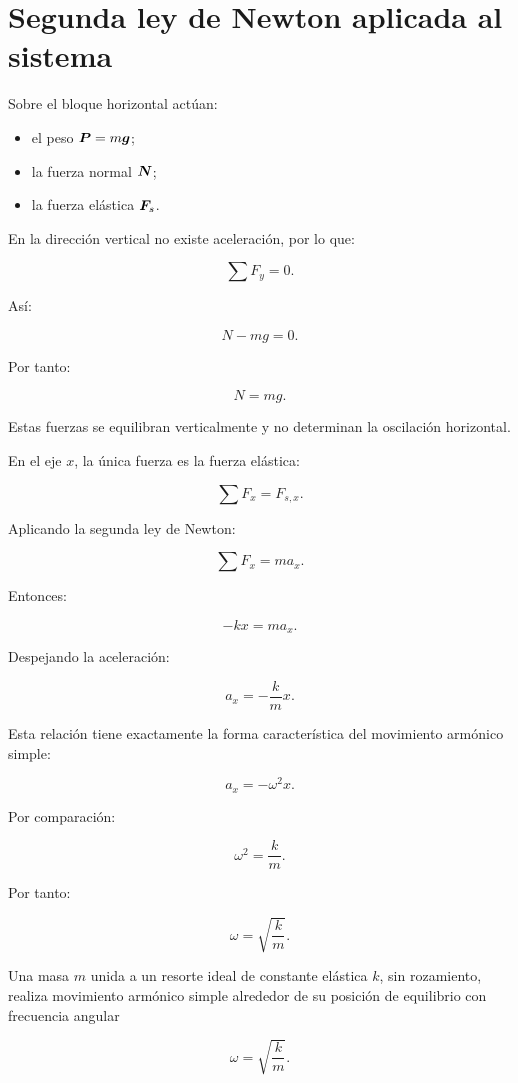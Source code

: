 \section{Segunda ley de Newton aplicada al sistema}

Sobre el bloque horizontal actúan:

\begin{itemize}
    \item el peso \(\bm{P}=m\bm{g}\);
    \item la fuerza normal \(\bm{N}\);
    \item la fuerza elástica \(\bm{F}_s\).
\end{itemize}

En la dirección vertical no existe aceleración, por lo que:

\[ \sum F_y=0. \]

Así:

\[ N-mg=0. \]

Por tanto:

\[ N=mg. \]

Estas fuerzas se equilibran verticalmente y no determinan la oscilación horizontal.

En el eje \(x\), la única fuerza es la fuerza elástica:

\[ \sum F_x=F_{s,x}. \]

Aplicando la segunda ley de Newton:

\[ \sum F_x=ma_x. \]

Entonces:

\[ -kx=ma_x. \]

Despejando la aceleración:

\[ a_x=-\frac{k}{m}x. \]

Esta relación tiene exactamente la forma característica del movimiento armónico simple:

\[ a_x=-\omega^2x. \]

Por comparación:

\[ \omega^2=\frac{k}{m}. \]

Por tanto:

\[ \boxed{\omega=\sqrt{\frac{k}{m}}}. \]

\begin{leyfisica}
Una masa \(m\) unida a un resorte ideal de constante elástica \(k\), sin rozamiento, realiza movimiento armónico simple alrededor de su posición de equilibrio con frecuencia angular

\[ \boxed{\omega=\sqrt{\frac{k}{m}}}. \]
\end{leyfisica}


